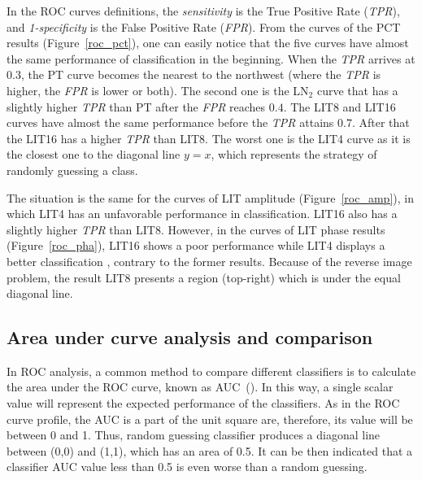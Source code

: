 
In the ROC curves definitions, the \textit{sensitivity} is the True Positive Rate (\textit{TPR}), and \textit{1-specificity} is the False Positive Rate (\textit{FPR}).
From the curves of the PCT results (Figure~\ref{roc_pct}), one can easily notice that the five curves have almost the same performance of classification in the beginning. When the \textit{TPR} arrives at $0.3$, the PT curve becomes the nearest to the northwest (where the \textit{TPR} is higher, the \textit{FPR} is lower or both). The second one is the LN$_2$ curve that has a slightly higher \textit{TPR} than PT after the \textit{FPR} reaches $0.4$. The LIT8 and LIT16 curves have almost the same performance before the \textit{TPR} attains $0.7$. After that the LIT16 has a higher \textit{TPR} than LIT8. The worst one is the LIT4 curve as it is the closest one to the diagonal line $y=x$, which represents the strategy of randomly guessing a class.

The situation is the same for the curves of LIT amplitude (Figure~\ref{roc_amp}), in which LIT4 has an unfavorable performance in classification. LIT16 also has a slightly higher \textit{TPR} than LIT8. However, in the curves of LIT phase results (Figure~\ref{roc_pha}), LIT16 shows a poor performance while LIT4 displays a better classification
, contrary to the former results. 
Because of the reverse image problem, the result LIT8 presents a region (top-right) which is under the equal diagonal line.


\subsection{Area under curve analysis and comparison}
In ROC analysis, a common method to compare different classifiers is to calculate the area under the ROC curve, known as AUC~(\citet{Fawcett2006}). In this way, a single scalar value will represent the expected performance of the classifiers. As in the ROC curve profile, the AUC is a part of the unit square are, therefore, its value will be between 0 and 1. Thus, random guessing classifier produces a diagonal line between (0,0) and (1,1), which has an area of 0.5. It can be then indicated that a classifier AUC value less than 0.5 is even worse than a random guessing. 

